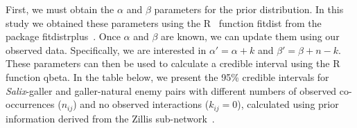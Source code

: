\documentclass[12pt]{article}
\begin{document}
  First, we must obtain the $\alpha$ and $\beta$ parameters for the prior distribution. In this study we obtained these parameters using the R~\citep{R} function fitdist from the package fitdistrplus~\citep{fitdistrplus}. Once $\alpha$ and $\beta$ are known, we can update them using our observed data. Specifically, we are interested in $\alpha'=\alpha+k$ and $\beta'=\beta+n-k$. These parameters can then be used to calculate a credible interval using the R~\citep{R} function qbeta. In the table below, we present the 95\% credible intervals for \emph{Salix}-galler and galler-natural enemy pairs with different numbers of observed co-occurrences ($n_{ij}$) and no observed interactions ($k_{ij}=0$), calculated using prior information derived from the Zillis sub-network~\citep{Kopelke2017}.

      \medskip
\end{document}

